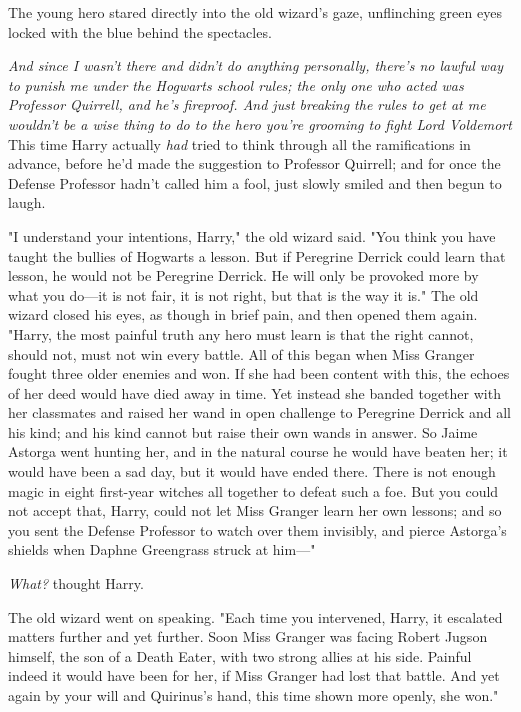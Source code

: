 The young hero stared directly into the old wizard's gaze, unflinching green
eyes locked with the blue behind the spectacles.

\emph{And since I wasn't there and didn't do anything personally, there's no
lawful way to punish me under the Hogwarts school rules; the only one who acted
was Professor Quirrell, and he's fireproof. And just breaking the rules to get
at me wouldn't be a wise thing to do to the hero you're grooming to fight Lord
Voldemort{\el}} This time Harry actually \emph{had} tried to think through
all the ramifications in advance, before he'd made the suggestion to Professor
Quirrell; and for once the Defense Professor hadn't called him a fool, just
slowly smiled and then begun to laugh.

"I understand your intentions, Harry," the old wizard said. "You think you have
taught the bullies of Hogwarts a lesson. But if Peregrine Derrick could learn
that lesson, he would not be Peregrine Derrick. He will only be provoked more
by what you do---it is not fair, it is not right, but that is the way it is."
The old wizard closed his eyes, as though in brief pain, and then opened them
again. "Harry, the most painful truth any hero must learn is that the right
cannot, should not, must not win every battle. All of this began when Miss
Granger fought three older enemies and won. If she had been content with this,
the echoes of her deed would have died away in time. Yet instead she banded
together with her classmates and raised her wand in open challenge to Peregrine
Derrick and all his kind; and his kind cannot but raise their own wands in
answer. So Jaime Astorga went hunting her, and in the natural course he would
have beaten her; it would have been a sad day, but it would have ended there.
There is not enough magic in eight first-year witches all together to defeat
such a foe. But you could not accept that, Harry, could not let Miss Granger
learn her own lessons; and so you sent the Defense Professor to watch over them
invisibly, and pierce Astorga's shields when Daphne Greengrass struck at him\mbox{---}"

\emph{What?} thought Harry.

The old wizard went on speaking. "Each time you intervened, Harry, it escalated
matters further and yet further. Soon Miss Granger was facing Robert Jugson
himself, the son of a Death Eater, with two strong allies at his side. Painful
indeed it would have been for her, if Miss Granger had lost that battle. And
yet again by your will and Quirinus's hand, this time shown more openly, she
won."

